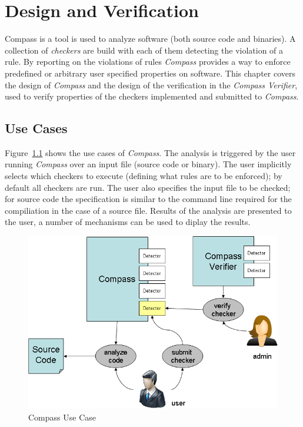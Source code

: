
\chapter{Design and Verification}

Compass is a tool is used to analyze software (both source code and binaries). 
A collection of {\em checkers} are build with each of them detecting the 
violation of a rule.  By reporting on the violations of rules {\em Compass} provides 
a way to enforce predefined or arbitrary user specified properties on software.
This chapter covers the design of {\em Compass} and the design of the verification in 
the \emph{Compass Verifier}, used to verify properties of the checkers implemented 
and submitted to {\em Compass}.

\section{Use Cases}

\label{design::UseCase}

Figure~\ref{Compass_usecase} shows the use cases of \emph{Compass}.
The analysis is triggered by the user running {\em Compass} over an
input file (source code or binary). The user implicitly selects 
which checkers to execute (defining what rules are to be enforced); 
by default all checkers are run. 
The user also specifies the input file to be checked; for source code 
the specification is similar to the command line required for the 
compiliation in the case of a source file.  Results of the analysis 
are presented to the user, a number of mechanisms can be used to 
diplay the results.

\begin{figure}[th]
\includegraphics[width=4.5in]{compass_pic.png}
\caption{Compass Use Case}
\label{Compass_usecase}
\end{figure}

